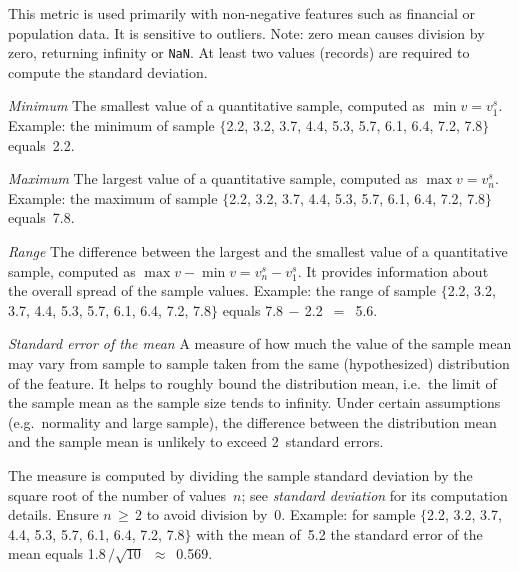 \begin{Description}
This metric is used primarily with non-negative features such as
financial or population data.  It is sensitive to outliers.
Note: zero mean causes division by zero, returning infinity or \texttt{NaN}.
At least two values (records) are required to compute the standard deviation.
\item[\it Minimum]
\OutputRowText{\OutputRowIDMinimum}
The smallest value of a quantitative sample, computed as $\min v = v^s_1$.
Example: the minimum of sample
$\{$2.2, 3.2, 3.7, 4.4, 5.3, 5.7, 6.1, 6.4, 7.2, 7.8$\}$
equals~2.2.
\item[\it Maximum]
\OutputRowText{\OutputRowIDMaximum}
The largest value of a quantitative sample, computed as $\max v = v^s_n$.
Example: the maximum of sample
$\{$2.2, 3.2, 3.7, 4.4, 5.3, 5.7, 6.1, 6.4, 7.2, 7.8$\}$
equals~7.8.
\item[\it Range]
\OutputRowText{\OutputRowIDRange}
The difference between the largest and the smallest value of a quantitative
sample, computed as $\max v - \min v = v^s_n - v^s_1$.
It provides information about the overall spread of the sample values.
Example: the range of sample
$\{$2.2, 3.2, 3.7, 4.4, 5.3, 5.7, 6.1, 6.4, 7.2, 7.8$\}$
equals 7.8$\,{-}\,$2.2~${=}$~5.6.
\item[\it Standard error of the mean]
\OutputRowText{\OutputRowIDStErrorMean}
A measure of how much the value of the sample mean may vary from sample
to sample taken from the same (hypothesized) distribution of the feature.
It helps to roughly bound the distribution mean, i.e.\
the limit of the sample mean as the sample size tends to infinity.
Under certain assumptions (e.g.\ normality and large sample), the difference
between the distribution mean and the sample mean is unlikely to exceed
2~standard errors.

The measure is computed by dividing the sample standard deviation
by the square root of the number of values~$n$; see \emph{standard deviation}
for its computation details.  Ensure $n\,{\geq}\,2$ to avoid division by~0.
Example: for sample
$\{$2.2, 3.2, 3.7, 4.4, 5.3, 5.7, 6.1, 6.4, 7.2, 7.8$\}$
with the mean of~5.2 the standard error of the mean
equals 1.8$\,{/}\sqrt{10}$~${\approx}$~0.569.


\end{Description}
